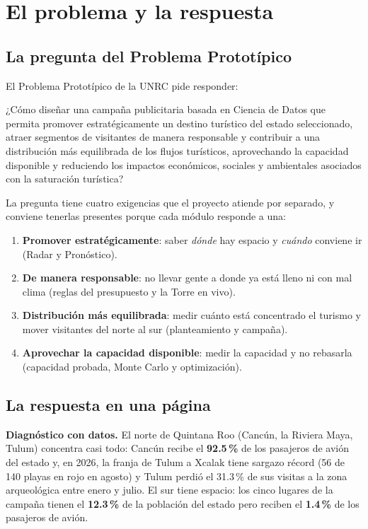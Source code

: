 \chapter{El problema y la respuesta}

\section{La pregunta del Problema Prototípico}
El Problema Prototípico de la UNRC pide responder:

\begin{cita}
¿Cómo diseñar una campaña publicitaria basada en Ciencia de Datos que permita promover estratégicamente un destino
turístico del estado seleccionado, atraer segmentos de visitantes de manera responsable y contribuir a una distribución
más equilibrada de los flujos turísticos, aprovechando la capacidad disponible y reduciendo los impactos económicos,
sociales y ambientales asociados con la saturación turística?
\end{cita}

La pregunta tiene cuatro exigencias que el proyecto atiende por separado, y conviene tenerlas presentes porque cada
módulo responde a una:
\begin{enumerate}
\item \textbf{Promover estratégicamente}: saber \emph{dónde} hay espacio y \emph{cuándo} conviene ir (Radar y Pronóstico).
\item \textbf{De manera responsable}: no llevar gente a donde ya está lleno ni con mal clima (reglas del presupuesto y la
  Torre en vivo).
\item \textbf{Distribución más equilibrada}: medir cuánto está concentrado el turismo y mover visitantes del norte al sur
  (planteamiento y campaña).
\item \textbf{Aprovechar la capacidad disponible}: medir la capacidad y no rebasarla (capacidad probada, Monte Carlo y
  optimización).
\end{enumerate}

\section{La respuesta en una página}
\textbf{Diagnóstico con datos.} El norte de Quintana Roo (Cancún, la Riviera Maya, Tulum) concentra casi todo: Cancún
recibe el \textbf{92.5\,\%} de los pasajeros de avión del estado y, en 2026, la franja de Tulum a Xcalak tiene sargazo
récord (56 de 140 playas en rojo en agosto) y Tulum perdió el 31.3\,\% de sus visitas a la zona arqueológica entre
enero y julio. El sur tiene espacio: los cinco lugares de la campaña tienen el \textbf{12.3\,\%} de la población del
estado pero reciben el \textbf{1.4\,\%} de los pasajeros de avión.

